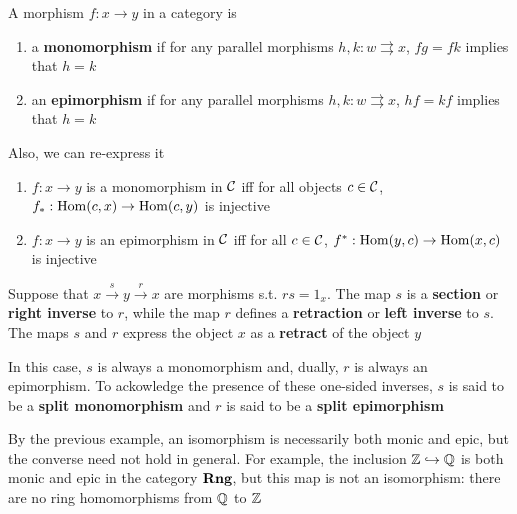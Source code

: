 \documentclass[11pt]{article}
\begin{document}
\begin{definition}[]
A morphism \(f:x\to y\) in a category is
\begin{enumerate}
\item a \textbf{monomorphism} if for any parallel morphisms \(h,k:w\rightrightarrows x\), \(fg=fk\) implies
that \(h=k\)
\item an \textbf{epimorphism} if for any parallel morphisms \(h,k:w\rightrightarrows x\), \(hf=kf\) implies
that \(h=k\)
\end{enumerate}
\end{definition}

Also, we can re-express it
\begin{enumerate}
\item \(f:x\to y\) is a monomorphism in \(\mathcal{C}\) iff for all
objects \(c\in\mathcal{C}\), \(f_*:\operatorname{Hom}(c,x)\to\operatorname{Hom}(c,y)\) is injective
\item \(f:x\to y\) is an epimorphism in \(\mathcal{C}\) iff for all \(c\in\mathcal{C}\), \(f^*:\operatorname{Hom}(y,c)\to\operatorname{Hom}(x,c)\)  is
injective
\end{enumerate}


\begin{examplle}[]
Suppose that \(x\xrightarrow{s}y\xrightarrow{r}x\) are morphisms s.t. \(rs=1_x\). The map \(s\) is a \textbf{section} or \textbf{right
inverse} to \(r\), while the map \(r\) defines a \textbf{retraction} or \textbf{left inverse} to \(s\). The
maps \(s\) and \(r\) express the object \(x\) as a \textbf{retract} of the object \(y\)

In this case, \(s\) is always a monomorphism and, dually, \(r\) is always an epimorphism. To
ackowledge the presence of these one-sided inverses, \(s\) is said to be a \textbf{split monomorphism}
and \(r\) is said to be a \textbf{split epimorphism}
\end{examplle}

\begin{examplle}[]
By the previous example, an isomorphism is necessarily both monic and epic, but the converse
need not hold in general. For example, the inclusion \(\mathbb{Z}\hookrightarrow\mathbb{Q}\) is both monic and epic in the
category \(\operatorname{\textbf{Rng}}\), but this map is not an isomorphism: there are no ring homomorphisms
from \(\mathbb{Q}\) to \(\mathbb{Z}\)
\end{examplle}
\end{document}
